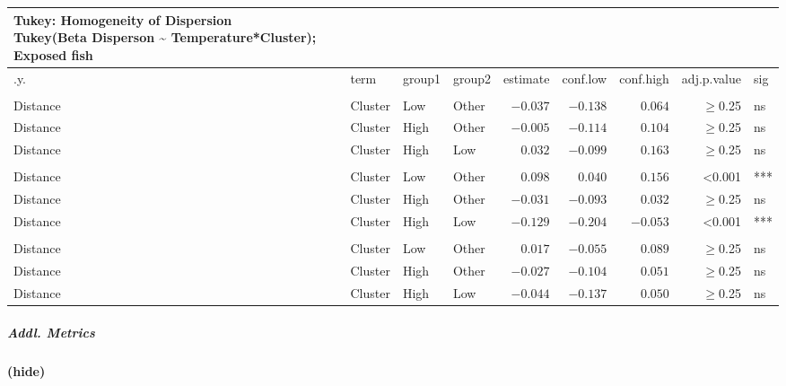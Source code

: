 \documentclass[
]{article}
\begin{document}
\begin{longtable}{llllrrrrl}
\caption*{
{\large Tukey: Homogeneity of Dispersion} \\ 
{\small Tukey(Beta Disperson \textasciitilde{} Temperature*Cluster); Exposed fish}
} \\ 
\toprule
.y. & term & group1 & group2 & estimate & conf.low & conf.high & adj.p.value & sig \\ 
\midrule\addlinespace[2.5pt]
\multicolumn{9}{l}{bray} \\ 
\midrule\addlinespace[2.5pt]
Distance & Cluster & Low & Other & $-0.037$ & $-0.138$ & $0.064$ & $\geq$0.25 & ns \\ 
Distance & Cluster & High & Other & $-0.005$ & $-0.114$ & $0.104$ & $\geq$0.25 & ns \\ 
Distance & Cluster & High & Low & $0.032$ & $-0.099$ & $0.163$ & $\geq$0.25 & ns \\ 
\midrule\addlinespace[2.5pt]
\multicolumn{9}{l}{canberra} \\ 
\midrule\addlinespace[2.5pt]
Distance & Cluster & Low & Other & $0.098$ & $0.040$ & $0.156$ & <0.001 & *** \\ 
Distance & Cluster & High & Other & $-0.031$ & $-0.093$ & $0.032$ & $\geq$0.25 & ns \\ 
Distance & Cluster & High & Low & $-0.129$ & $-0.204$ & $-0.053$ & <0.001 & *** \\ 
\midrule\addlinespace[2.5pt]
\multicolumn{9}{l}{gunifrac} \\ 
\midrule\addlinespace[2.5pt]
Distance & Cluster & Low & Other & $0.017$ & $-0.055$ & $0.089$ & $\geq$0.25 & ns \\ 
Distance & Cluster & High & Other & $-0.027$ & $-0.104$ & $0.051$ & $\geq$0.25 & ns \\ 
Distance & Cluster & High & Low & $-0.044$ & $-0.137$ & $0.050$ & $\geq$0.25 & ns \\ 
\bottomrule
\end{longtable}

\subparagraph{Addl. Metrics}\label{addl.-metrics-11}

\subsubsection{}\label{section-3}

\paragraph{(hide)}\label{hide-18}
\end{document}
